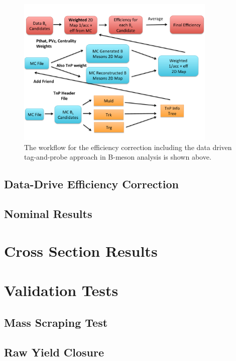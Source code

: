 \begin{figure}[h]
\begin{center}
\includegraphics[width= 0.85\textwidth]{Figures/Chapter4/EffCorrMethod.pdf}
\caption{The workflow for the efficiency correction including the data driven tag-and-probe approach in B-meson analysis is shown above.}
\label{BsMCData}
\end{center}
\end{figure}

\subsection{Data-Drive Efficiency Correction}


\subsection{Nominal Results}

\section{Cross Section Results} 

\section{Validation Tests} 

\subsection{Mass Scraping Test}

\subsection{Raw Yield Closure}

